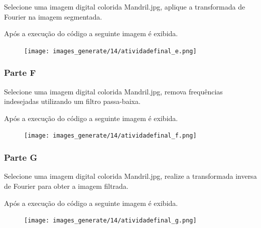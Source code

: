 \documentclass[10pt,a4paper]{article}
\begin{document}
Selecione uma imagem digital colorida Mandril.jpg, aplique a transformada de Fourier na imagem segmentada. 



Após a execução do código a seguinte imagem é exibida.

\begin{figure}[H]
    \centering
    {{\texttt{[image: images\_generate/14/atividadefinal\_e.png]}}}
\end{figure}


\subsubsection{Parte F}

Selecione uma imagem digital colorida Mandril.jpg, remova frequências indesejadas utilizando um filtro passa-baixa. 



Após a execução do código a seguinte imagem é exibida.

\begin{figure}[H]
    \centering
    {{\texttt{[image: images\_generate/14/atividadefinal\_f.png]}}}
\end{figure}


\subsubsection{Parte G}

Selecione uma imagem digital colorida Mandril.jpg, realize a transformada inversa de Fourier para obter a imagem filtrada.



Após a execução do código a seguinte imagem é exibida.

\begin{figure}[H]
    \centering
    {{\texttt{[image: images\_generate/14/atividadefinal\_g.png]}}}
\end{figure}
\end{document}
